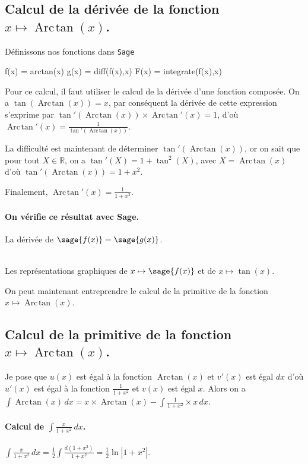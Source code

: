 \documentclass[a4paper,12pt]{report}
\def\eclaire{\mathbb}
\def\R{\ensuremath{\eclaire R}}
\renewcommand{\arctan}{\mathop{\mathrm{Arc\mspace{2mu}tan}}}
\begin{document}
\subsection{Calcul de la dérivée de la fonction $x \mapsto \arctan(x) $.}
Définissons nos fonctions dans {\texttt{Sage}}
\begin{sageblock}
    f(x) = arctan(x)
    g(x) = diff(f(x),x)
    F(x) = integrate(f(x),x)
\end{sageblock}
Pour ce calcul, il faut utiliser le calcul de la dérivée d'une fonction composée. On a $\tan(\arctan(x))=x$, par conséquent la dérivée de cette expression s'exprime par $ \tan'(\arctan(x)) \times \arctan\nolimits'(x) = 1$, d'où $\arctan\nolimits'(x) = \frac{1}{\tan'(\arctan(x))} $.

La difficulté est maintenant de déterminer $\tan'(\arctan(x))$, or on sait que pour tout $X \in \R$, on a $ \tan'(X) =1+\tan^2(X) $, avec $X= \arctan(x)$ d'où $\tan'(\arctan(x)) = 1+x^2$.

Finalement, $\arctan\nolimits'(x) = \frac{1}{1+x^2}$.
\paragraph{On vérifie ce résultat avec Sage.}
La dérivée de $\sage{f(x)} = \sage{g(x)} $.

\begin{center}
\\
Les représentations graphiques de $x \mapsto \sage{f(x)} $ et de $x\mapsto \tan(x)$.
\end{center}
On peut maintenant entreprendre le calcul de la primitive de la  fonction  $x \mapsto \arctan(x) $.


\subsection{Calcul de la primitive de la fonction  $x \mapsto \arctan(x) $.}
Je pose que $u(x)$  est égal à la fonction $\arctan(x)$ et $v'(x)$ est égal $dx$  d'où $u'(x)$  est égal à la fonction $ \frac{1}{1+ x^2} $ et $v(x)$ est égal $x$.
Alors on a $\int \arctan(x) \, dx = x \times \arctan(x) -\int \frac{1}{1+x^2} \times x \, dx $.

\paragraph{Calcul de $\int \frac{x}{1+ x^2} \, dx $.}
$\int \frac{x}{1+ x^2} \, dx = \frac{1}{2} \int \frac{d(1+x^2)}{1+ x^2} = \frac{1}{2} \ln \left| 1+ x^2 \right| $.
\end{document}
